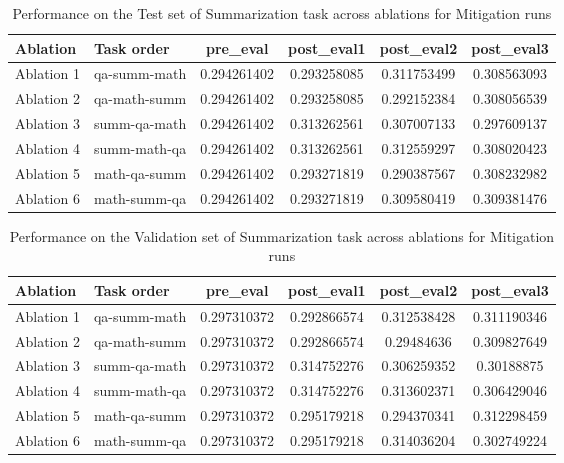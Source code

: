 \begin{table}[!ht]
    \centering
    \caption{Performance on the Test set of Summarization task across ablations for Mitigation runs}
    \begin{tabular}{|l|l|S[table-format=2.4]|S[table-format=2.4]|S[table-format=2.4]|S[table-format=2.4]|}
    \hline
        \textbf{Ablation} & \textbf{Task order} & \textbf{pre\_eval} & \textbf{post\_eval1} & \textbf{post\_eval2} & \textbf{post\_eval3 } \\ \hline
        Ablation 1 & qa-summ-math & 0.294261402 & 0.293258085 & 0.311753499 & 0.308563093  \\ 
        Ablation 2 & qa-math-summ & 0.294261402 & 0.293258085 & 0.292152384 & 0.308056539  \\ 
        Ablation 3 & summ-qa-math & 0.294261402 & 0.313262561 & 0.307007133 & 0.297609137  \\ 
        Ablation 4 & summ-math-qa & 0.294261402 & 0.313262561 & 0.312559297 & 0.308020423  \\ 
        Ablation 5 & math-qa-summ & 0.294261402 & 0.293271819 & 0.290387567 & 0.308232982  \\ 
        Ablation 6 & math-summ-qa & 0.294261402 & 0.293271819 & 0.309580419 & 0.309381476  \\ \hline
    \end{tabular}
    \label{tab:SummTestMitigation}
\end{table}

\begin{table}[!ht]
    \centering
    \caption{Performance on the Validation set of Summarization task across ablations for Mitigation runs}
    \begin{tabular}{|l|l|S[table-format=2.4]|S[table-format=2.4]|S[table-format=2.4]|S[table-format=2.4]|}
    \hline
        \textbf{Ablation} & \textbf{Task order} & \textbf{pre\_eval} & \textbf{post\_eval1} & \textbf{post\_eval2} & \textbf{post\_eval3 } \\ \hline
        Ablation 1 & qa-summ-math & 0.297310372 & 0.292866574 & 0.312538428 & 0.311190346  \\ 
        Ablation 2 & qa-math-summ & 0.297310372 & 0.292866574 & 0.29484636 & 0.309827649  \\ 
        Ablation 3 & summ-qa-math & 0.297310372 & 0.314752276 & 0.306259352 & 0.30188875  \\ 
        Ablation 4 & summ-math-qa & 0.297310372 & 0.314752276 & 0.313602371 & 0.306429046  \\ 
        Ablation 5 & math-qa-summ & 0.297310372 & 0.295179218 & 0.294370341 & 0.312298459  \\ 
        Ablation 6 & math-summ-qa & 0.297310372 & 0.295179218 & 0.314036204 & 0.302749224  \\ \hline
    \end{tabular}
    \label{tab:SummValMitigation}
\end{table}

